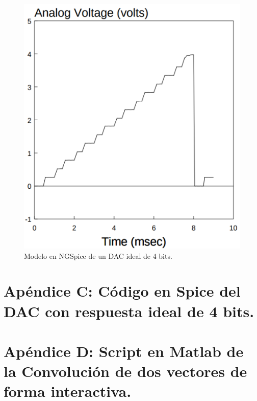 \begin{figure}[H]
\begin{centering}
\includegraphics[scale=0.4]{img/ideal_dac}
\par\end{centering}
\caption{\label{fig:Modelo-en-NGSpice-1}Modelo en NGSpice de un DAC ideal
de 4 bits.}
\end{figure}

\newpage{}

\part*{Ap\'{e}ndice C: C\'{o}digo en Spice del DAC con respuesta ideal de
4 bits.}



\newpage{}

\part*{Ap\'{e}ndice D: Script en Matlab de la Convoluci\'{o}n de dos vectores
de forma interactiva.}


